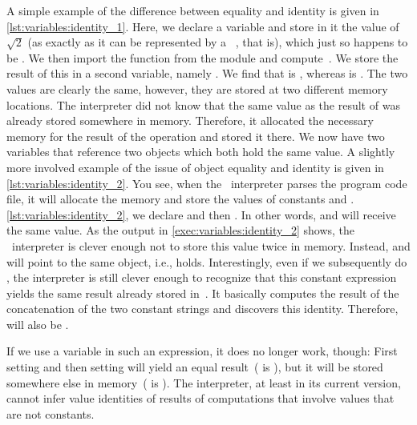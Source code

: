 A simple example of the difference between equality and identity is given in \cref{lst:variables:identity_1}.
Here, we declare a  variable and store in it the value of~$\sqrt{2}$ (as exactly as it can be represented by a \python\ , that is), which just so happens to be .
We then import the function  from the  module and compute~.
We store the result of this in a second variable, namely .
We find that  is , whereas  is .
The two values are clearly the same, however, they are stored at two different memory locations.
The interpreter did not know that the same value as the result of  was already stored somewhere in memory.
Therefore, it allocated the necessary memory for the result of the  operation and stored it there.
We now have two variables that reference two objects which both hold the same value.%
%
%
%
A slightly more involved example of the issue of object equality and identity is given in \cref{lst:variables:identity_2}.
You see, when the \python\ interpreter parses the program code file, it will allocate the memory and store the values of constants and .
\cref{lst:variables:identity_2}, we declare  and then .
In other words,  and  will receive the same value.
As the output in \cref{exec:variables:identity_2} shows, the \python\ interpreter is clever enough not to store this value twice in memory.
Instead,  and  will point to the same object, i.e.,  holds.
Interestingly, even if we subsequently do , the interpreter is still clever enough to recognize that this constant expression yields the same result already stored in~.
It basically computes the result of the concatenation of the two constant strings and discovers this identity.
Therefore,  will also be .

If we use a variable in such an expression, it does no longer work, though:
First setting  and then setting  will yield an equal result~( is ), but it will be stored somewhere else in memory~( is ).
The interpreter, at least in its current version, cannot infer value identities of results of computations that involve values that are not constants.

